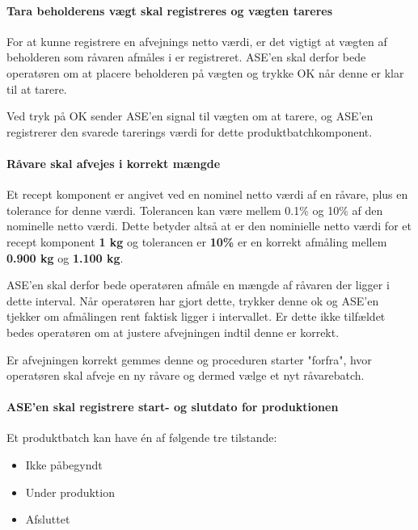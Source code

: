 \documentclass[a4paper]{article}
\begin{document}

\paragraph{Tara beholderens vægt skal registreres og vægten tareres} %

For at kunne registrere en afvejnings netto værdi, er det vigtigt at vægten af beholderen som råvaren afmåles i er registreret. ASE'en skal derfor bede operatøren om at placere beholderen på vægten og trykke OK når denne er klar til at tarere.

Ved tryk på OK sender ASE'en signal til vægten om at tarere, og ASE'en registrerer den svarede tarerings værdi for dette produktbatchkomponent.


\paragraph{Råvare skal afvejes i korrekt mængde} %

Et recept komponent er angivet ved en nominel netto værdi af en råvare, plus en tolerance for denne værdi. Tolerancen kan være mellem 0.1\% og 10\% af den nominelle netto værdi. Dette betyder altså at er den nominielle netto værdi for et recept komponent \textbf{1 kg} og tolerancen er \textbf{10\%} er en korrekt afmåling mellem \textbf{0.900 kg} og \textbf{1.100 kg}.

ASE'en skal derfor bede operatøren afmåle en mængde af råvaren der ligger i dette interval. Når operatøren har gjort dette, trykker denne ok og ASE'en tjekker om afmålingen rent faktisk ligger i intervallet. Er dette ikke tilfældet bedes operatøren om at justere afvejningen indtil denne er korrekt.

Er afvejningen korrekt gemmes denne og proceduren starter "forfra", hvor operatøren skal afveje en ny råvare og dermed vælge et nyt råvarebatch.


\paragraph{ASE'en skal registrere start- og slutdato for produktionen} %

Et produktbatch kan have én af følgende tre tilstande:
\begin{itemize}
  \item Ikke påbegyndt
  \item Under produktion
  \item Afsluttet
\end{itemize}
\end{document}
